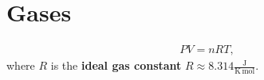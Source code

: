 \section{Gases}

    \begin{theorem}
        \begin{gather}
            \label{thermo:ideal_gas_law}
            PV = nRT,
        \end{gather}
        where $R$ is the \textbf{ideal gas constant} $R\approx8.314 \frac{\mathrm{J}}{\mathrm{K\,mol}}$.
    \end{theorem}